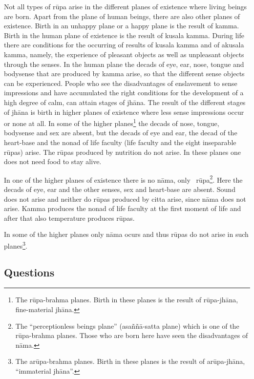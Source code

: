 \documentclass{book}
\begin{document}
Not all types of r\=upa arise in the different planes of existence where
living beings are born. Apart from the plane of human beings, there are
also other planes of existence. Birth in an unhappy plane or a happy
plane is the result of kamma. Birth in the human plane of existence is
the result of kusala kamma. During life there are conditions for the
occurring of results of kusala kamma and of akusala kamma, namely, the
experience of pleasant objects as well as unpleasant objects through
the senses. In the human plane the decads of eye, ear, nose, tongue and
bodysense that are produced by kamma arise, so that the different sense
objects can be experienced. People who see the disadvantages of
enslavement to sense impressions and have accumulated the right
conditions for the development of a high degree of calm, can attain
stages of jh{\=a}na. The result of the different stages of jh{\=a}na is
birth in higher planes of existence where less sense impressions occur
or none at all. In some of the higher planes\footnote{The
r\=upa-brahma planes. Birth in these planes is the result of
r\=upa-jh{\=a}na, fine-material jh{\=a}na.} the decads of nose,
tongue, bodysense and sex are absent, but the decads of eye and ear,
the decad of the heart-base and the nonad of life faculty (life
faculty and the eight inseparable r\=upas) arise. The r\=upas produced
by nutrition do not arise. In these planes one does not need food to
stay alive. 

In one of the higher planes of existence there is no n{\=a}ma, only
\ r\=upa\footnote{The ``perceptionless beings plane''
(asa\~n\~n{\=a}-satta plane) which is one of the r\=upa-brahma
planes. Those who are born here have seen the disadvantages of
n{\=a}ma.}. Here the decads of eye, ear and the other senses, sex and
heart-base are absent. Sound does not arise and neither do r\=upas
produced by citta arise, since n{\=a}ma does not arise. Kamma produces
the nonad of life faculty at the first moment of life and after that
also temperature produces r\=upas. 

In some of the higher planes only n{\=a}ma ocurs and thus r\=upas do not
arise in such planes\footnote{The ar\=upa-brahma planes. Birth in
these planes is the result of ar\=upa-jh{\=a}na, ``immaterial
jh{\=a}na''.}. 









\subsection*{Questions}
\end{document}

